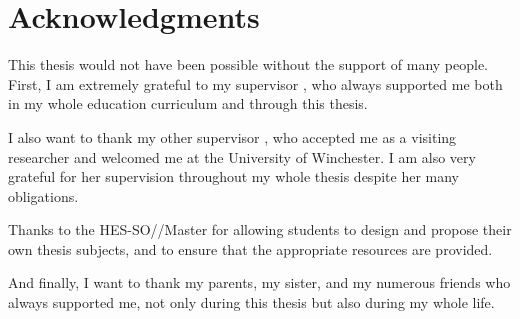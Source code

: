 \chapter*{Acknowledgments}

This thesis would not have been possible without the support of many people. First, I am extremely grateful to my supervisor \SupervisorOne, who always supported me both in my whole education curriculum and through this thesis.

I also want to thank my other supervisor \SupervisorTwo, who accepted me as a visiting researcher and welcomed me at the University of Winchester. I am also very grateful for her supervision throughout my whole thesis despite her many obligations.

Thanks to the HES-SO//Master for allowing students to design and propose their own thesis subjects, and to ensure that the appropriate resources are provided.

And finally, I want to thank my parents, my sister, and my numerous friends who always supported me, not only during this thesis but also during my whole life. 